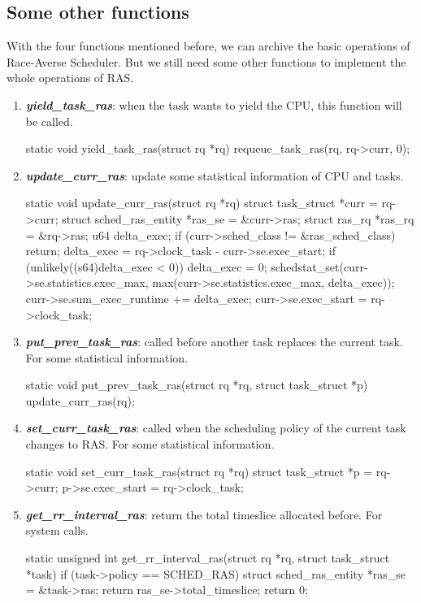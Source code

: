 \subsection{Some other functions}

With the four functions mentioned before, we can archive the basic operations of Race-Averse Scheduler. But we still need some other functions to implement the whole operations of RAS.

\begin{enumerate}
    \item \textit{\textbf{yield\_task\_ras}}: when the task wants to yield the CPU, this function will be called.
    \begin{codeblock}[language=C]
static void
yield_task_ras(struct rq *rq)
{
    requeue_task_ras(rq, rq->curr, 0);
}
    \end{codeblock}
    \item \textit{\textbf{update\_curr\_ras}}: update some statistical information of CPU and tasks.
    \begin{codeblock}[language=C]
static void update_curr_ras(struct rq *rq)
{
    struct task_struct *curr = rq->curr;
    struct sched_ras_entity *ras_se = &curr->ras;
    struct ras_rq *ras_rq = &rq->ras;
    u64 delta_exec;
    if (curr->sched_class != &ras_sched_class)
        return;
    delta_exec = rq->clock_task - curr->se.exec_start;
    if (unlikely((s64)delta_exec < 0))
        delta_exec = 0;
    schedstat_set(curr->se.statistics.exec_max,
	    		  max(curr->se.statistics.exec_max, delta_exec));
    curr->se.sum_exec_runtime += delta_exec;
    curr->se.exec_start = rq->clock_task;
}
    \end{codeblock}
    \item \textit{\textbf{put\_prev\_task\_ras}}: called before another task replaces the current task. For some statistical information.
    \begin{codeblock}[language=C]
static void
put_prev_task_ras(struct rq *rq, struct task_struct *p)
{
   	update_curr_ras(rq);
}
    \end{codeblock}
    \item \textit{\textbf{set\_curr\_task\_ras}}: called when the scheduling policy of the current task changes to RAS. For some statistical information.
    \begin{codeblock}[language=C]
static void
set_curr_task_ras(struct rq *rq)
{
	struct task_struct *p = rq->curr;
	p->se.exec_start = rq->clock_task;
}
    \end{codeblock}
    \item \textit{\textbf{get\_rr\_interval\_ras}}: return the total timeslice allocated before. For system calls.
    \begin{codeblock}[language=C]
static unsigned int
get_rr_interval_ras(struct rq *rq, struct task_struct *task)
{
	if (task->policy == SCHED_RAS)
	{
		struct sched_ras_entity *ras_se = &task->ras;
		return ras_se->total_timeslice;
	}
	return 0;
}
    \end{codeblock}
\end{enumerate}

